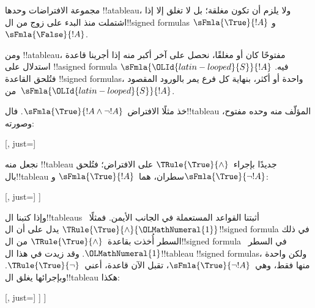 \documentclass[../../../include/open-logic-section]{subfiles}
\begin{document}
\begin{ex}
  مجموعة الافتراضات وحدها !!a{tableau}، ولا يلزم أن تكون مغلقة؛
  بل لا تغلق إلا إذا اشتملت منذ البدء على زوج من ال!!{signed formula}s
  $\sFmla{\True}{!A}$ و$\sFmla{\False}{!A}$.

  ومن !!a{tableau}، مفتوحًا كان أو مغلقًا، نحصل على آخر أكبر منه
  إذا أجرينا قاعدة استدلال على !!a{signed formula}
  $\sFmla{{\OLId{latin-looped}{S}}}{!A}$ فيه. فتُلحق القاعدة !!{signed formula}s، واحدة
  أو أكثر، بنهاية كل فرع يمر بالورود المقصود من~$\sFmla{{\OLId{latin-looped}{S}}}{!A}$.


  خذ مثلًا الافتراض~$\sFmla{\True}{!A \land \lnot !A}$.
  فال!!{tableau} المؤلّف منه وحده مفتوح، وصورته:
  \begin{center}
    \begin{tableau}{}
      [, just=\TAss]
    \end{tableau}{}
  \end{center}
  نجعل منه !!{tableau} جديدًا بإجراء~$\TRule{\True}{\land}$
  على الافتراض؛ فتُلحق بال!!{tableau} سطران،
  هما~$\sFmla{\True}{!A}$ و$\sFmla{\True}{\lnot !A}$:
  \begin{center}
    \begin{tableau}{}
      [, just=\TAss
        [\sFmla{\True}{\formula{A}}, just={\TRule{\True}{\land}[1]},
          [\sFmla{\True}{\lnot \formula{A}}, just={\TRule{\True}{\land}[1]}
          ]
        ]
      ]
    \end{tableau}{}
  \end{center}
  وإذا كتبنا ال!!{tableau}s أثبتنا القواعد المستعملة في الجانب الأيمن.
  فمثلًا~$\TRule{\True}{\land} {\OLMathNumeral{1}}$ يدل على أن ال!!{signed formula}
  في ذلك السطر أُخذت بقاعدة~$\TRule{\True}{\land}$ من
  ال!!{signed formula} في السطر~${\OLMathNumeral{1}}$.
  وقد زيدت في هذا ال!!{tableau} !!{signed formula}s، ولكن واحدة
  منها فقط، وهي~$\sFmla{\True}{\lnot !A}$، تقبل الآن قاعدة،
  أعني~$\TRule{\True}{\lnot}$. وبإجرائها يغلق ال!!{tableau} هكذا:
  \begin{center}
    \begin{tableau}{}
      [, just=\TAss
        [\sFmla{\True}{\formula{A}}, just={\TRule{\True}{\land}[1]}
          [\sFmla{\True}{\lnot \formula{A}}, just={\TRule{\True}{\land}[1]}
            [\sFmla{\False}{\formula{A}}, just={\TRule{\True}{\lnot}[3]}, close]
          ]
        ]
      ]
    \end{tableau}{}
  \end{center}
\end{ex}
\end{document}
